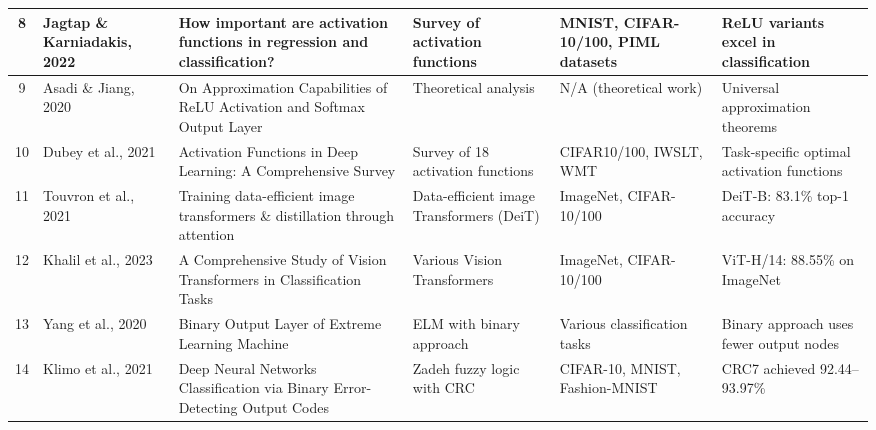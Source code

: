 \begin{table}[htbp]
\begin{tabular}{|c|p{1.8cm}|p{2.5cm}|p{2.5cm}|p{2.2cm}|p{2.5cm}|}
\hline
8 & Jagtap \& Karniadakis, 2022 & How important are activation functions in regression and classification? & Survey of activation functions & MNIST, CIFAR-10/100, PIML datasets & ReLU variants excel in classification \\ 
\hline
9 & Asadi \& Jiang, 2020 & On Approximation Capabilities of ReLU Activation and Softmax Output Layer & Theoretical analysis & N/A (theoretical work) & Universal approximation theorems \\ 
\hline
10 & Dubey et al., 2021 & Activation Functions in Deep Learning: A Comprehensive Survey & Survey of 18 activation functions & CIFAR10/100, IWSLT, WMT & Task-specific optimal activation functions \\ 
\hline
11 & Touvron et al., 2021 & Training data-efficient image transformers \& distillation through attention & Data-efficient image Transformers (DeiT) & ImageNet, CIFAR-10/100 & DeiT-B: 83.1\% top-1 accuracy \\ 
\hline
12 & Khalil et al., 2023 & A Comprehensive Study of Vision Transformers in Classification Tasks & Various Vision Transformers & ImageNet, CIFAR-10/100 & ViT-H/14: 88.55\% on ImageNet \\ 
\hline
13 & Yang et al., 2020 & Binary Output Layer of Extreme Learning Machine & ELM with binary approach & Various classification tasks & Binary approach uses fewer output nodes \\ 
\hline
14 & Klimo et al., 2021 & Deep Neural Networks Classification via Binary Error-Detecting Output Codes & Zadeh fuzzy logic with CRC & CIFAR-10, MNIST, Fashion-MNIST & CRC7 achieved 92.44--93.97\% \\ 
\hline

\end{tabular}
\end{table}

